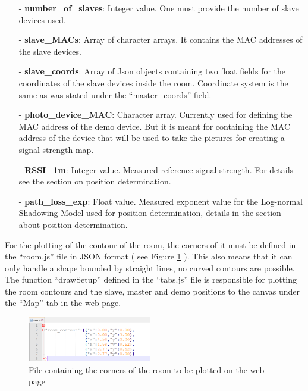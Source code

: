 \documentclass[11pt,a4paper]{article}
\begin{document}
\begin{itemize}
\item[-] \textbf{number\_of\_slaves}: Integer value. One must provide the number of slave devices used.\\

\item[-] \textbf{slave\_MACs}: Array of character arrays. It contains the MAC addresses of the slave devices.\\

\item[-] \textbf{slave\_coords}: Array of Json objects containing two float fields for the coordinates of the slave devices inside the room. Coordinate system is the same as was stated under the ``master\_coords'' field.\\

\item[-] \textbf{photo\_device\_MAC}: Character array. Currently used for defining the MAC address of the demo device. But it is meant for containing the MAC address of the device that will be used to take the pictures for creating a signal strength map.\\

\item[-] \textbf{RSSI\_1m}: Integer value. Measured reference signal strength. For details see the section on position determination.\\

\item[-] \textbf{path\_loss\_exp}: Float value. Measured exponent value for the Log-normal Shadowing Model used for position determination, details in the section about position determination.\\

\end{itemize}

For the plotting of the contour of the room, the corners of it must be defined in the ``room.js'' file in JSON format ( see Figure \ref{fig:roomContour} ). This also means that it can only handle a shape bounded by straight lines, no curved contours are possible. The function ``drawSetup'' defined in the ``tabs.js'' file is responsible for plotting the room contours and the slave, master and demo positions to the canvas under the ``Map'' tab in the web page.


\begin{figure}[H]
    \centering
    \includegraphics[width = 0.48\textwidth]{figures/roomData.png}
    \caption{File containing the corners of the room to be plotted on the web page}
    \label{fig:roomContour}
\end{figure}
\end{document}
